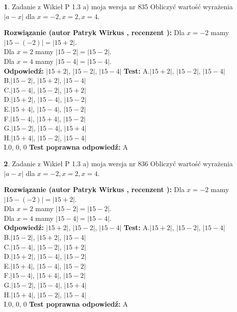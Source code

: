 \documentclass[12pt, a4paper]{article}
\theoremstyle{definition} %
\newtheorem{zad}{}
\newcommand{\zadStart}[1]{\begin{zad}#1\newline}
\newcommand{\zadStop}{\end{zad}}
\newcommand{\rozwStart}[2]{\noindent \textbf{Rozwiązanie (autor #1 , recenzent #2): }\newline}
\newcommand{\rozwStop}{\newline}
\newcommand{\odpStart}{\noindent \textbf{Odpowiedź:}\newline}
\newcommand{\odpStop}{\newline}
\newcommand{\testStart}{\noindent \textbf{Test:}\newline}
\newcommand{\testStop}{\newline}
\newcommand{\kluczStart}{\noindent \textbf{Test poprawna odpowiedź:}\newline}
\newcommand{\kluczStop}{\newline}
\begin{document}
\zadStart{Zadanie z Wikieł P 1.3 a) moja wersja nr 835}
Obliczyć wartość wyrażenia $|a - x|$ dla $x=-2,x=2,x=4$.
\zadStop
\rozwStart{Patryk Wirkus}{}
Dla $x = -2$ mamy $|15 - (-2)| = |15 + 2|$.\\
Dla $x = 2$ mamy $|15 - 2| = |15 - 2|$.\\
Dla $x = 4$ mamy $|15 - 4| = |15 - 4|$.\\
\rozwStop
\odpStart
$|15 + 2|$, $|15 - 2|$, $|15 - 4|$
\odpStop
\testStart
A.$|15 + 2|$, $|15 - 2|$, $|15 - 4|$\\
B.$|15 - 2|$, $|15 + 2|$, $|15 - 4|$\\
C.$|15 - 4|$, $|15 - 2|$, $|15 + 2|$\\
D.$|15 + 2|$, $|15 - 4|$, $|15 - 2|$\\
E.$|15 + 4|$, $|15 - 4|$, $|15 - 2|$\\
F.$|15 - 4|$, $|15 + 4|$, $|15 - 2|$\\
G.$|15 - 2|$, $|15 - 4|$, $|15 + 4|$\\
H.$|15 + 4|$, $|15 - 2|$, $|15 - 4|$\\
I.$0$, $0$, $0$
\testStop
\kluczStart
A
\kluczStop



\zadStart{Zadanie z Wikieł P 1.3 a) moja wersja nr 836}
Obliczyć wartość wyrażenia $|a - x|$ dla $x=-2,x=2,x=4$.
\zadStop
\rozwStart{Patryk Wirkus}{}
Dla $x = -2$ mamy $|15 - (-2)| = |15 + 2|$.\\
Dla $x = 2$ mamy $|15 - 2| = |15 - 2|$.\\
Dla $x = 4$ mamy $|15 - 4| = |15 - 4|$.\\
\rozwStop
\odpStart
$|15 + 2|$, $|15 - 2|$, $|15 - 4|$
\odpStop
\testStart
A.$|15 + 2|$, $|15 - 2|$, $|15 - 4|$\\
B.$|15 - 2|$, $|15 + 2|$, $|15 - 4|$\\
C.$|15 - 4|$, $|15 - 2|$, $|15 + 2|$\\
D.$|15 + 2|$, $|15 - 4|$, $|15 - 2|$\\
E.$|15 + 4|$, $|15 - 4|$, $|15 - 2|$\\
F.$|15 - 4|$, $|15 + 4|$, $|15 - 2|$\\
G.$|15 - 2|$, $|15 - 4|$, $|15 + 4|$\\
H.$|15 + 4|$, $|15 - 2|$, $|15 - 4|$\\
I.$0$, $0$, $0$
\testStop
\kluczStart
A
\kluczStop
\end{document}

